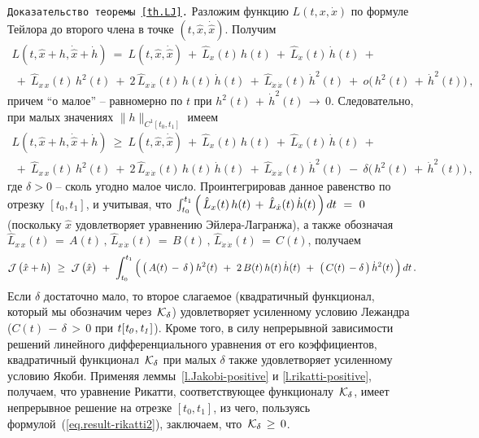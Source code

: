 \documentclass[12pt,a4paper]{article}
\newcommand{\cJ}{{\cal{J}}}
\newcommand{\cK}{{\cal{K}}}
\begin{document}
{\tt Доказательство теоремы~\ref{th.LJ}.} Разложим функцию $L(t,
x, \dot x)$ по формуле Тейлора до второго члена в точке $(t, \hat
x, \dot {\hat x})$. Получим
$$
\begin{array}{l}
L(t, \hat x + h, \dot {\hat x} + \dot h)\ =  \ L(t, \hat x, \dot
{\hat x} )\ + \
\hat L_{x}(t)\, h(t) \ + \ \hat L_{\dot x}(t)\, \dot h (t)\ +\  \\
\ +\ \hat L_{x\, x}(t)\, h^2(t) \ + \ 2\, \hat L_{x\, \dot x}(t)\,
h (t)\, \dot h (t)\ + \ \hat L_{\dot x \, \dot x}(t)\, {\dot h}^2
(t)\ + \ o\bigl(\, h^2(t)\, + \, {\dot h}^2(t)\bigr)\, ,
\end{array}
$$
причем ``о малое'' -- равномерно по $t$ при $h^2(t)\, + \, {\dot
h}^2(t) \, \to \, 0$. Следовательно, при малых значениях
$\|h\|_{C^1[t_0, t_1]}$ имеем
$$
\begin{array}{l}
L(t, \hat x + h, \dot {\hat x} + \dot h)\ \ge  \ L(t, \hat x, \dot
{\hat x} )\ + \
\hat L_{x}(t)\, h(t) \ + \ \hat L_{\dot x}(t)\, \dot h (t)\ +\  \\
\ +\ \hat L_{x\, x}(t)\, h^2(t) \ + \ 2\, \hat L_{x\, \dot x}(t)\,
h (t)\, \dot h (t)\ + \ \hat L_{\dot x \, \dot x}(t)\, {\dot h}^2
(t)\ - \ \delta \bigl(\, h^2(t)\, + \, {\dot h}^2(t)\bigr)\, ,
\end{array}
$$
где $\delta >0$ -- сколь угодно малое число. Проинтегрировав
данное равенство по отрезку $[t_0, t_1]$,  и учитывая, что
$\int_{t_0}^{t_1}\, \Bigl( \, \hat L_{x}(t)\, h(t) \, + \, \hat
L_{\dot x}(t)\, \dot h (t)\, \Bigr)\, d  t \ = \ 0$ (поскольку
$\hat x$ удовлетворяет уравнению Эйлера-Лагранжа), а также
обозначая $\hat L_{x\, x}(t)\, = \, A(t)\, , \, \hat L_{x\, \dot
x}(t)\, = \, B(t)\, , \, \hat L_{\dot x \, \dot x}(t)\, = \,
C(t)$, получаем
$$
\cJ\, \bigl( \hat x + h\bigr)\ \ge  \ \cJ\, \bigl( \hat x \bigr)\
+ \ \int_{t_0}^{t_1}\, \Bigl(\, \bigl( \, A(t)\, - \, \delta \,
\bigr) \, h^2(t) \ + \ 2\, B(t)\, h (t)\, \dot h (t)\ + \ \bigl(
\, C(t)\, - \delta \, \bigr)\, {\dot h}^2 (t)\, \Bigr)\, d t\, .
$$
Если $\delta$ достаточно мало, то второе слагаемое (квадратичный
функционал, который мы обозначим через~$\cK_{\delta}$)
удовлетворяет усиленному условию Лежандра ($C(t)\, - \, \delta \,
> \, 0$ при $t \it [t_0, t_1]$). Кроме того, в силу непрерывной
зависимости решений линейного дифференциального уравнения от его
коэффициентов, квадратичный функционал~$\cK_{\delta}$ при малых
$\delta$ также удовлетворяет усиленному условию Якоби. Применяя
леммы~\ref{l.Jakobi-positive} и \ref{l.rikatti-positive},
получаем, что уравнение Рикатти, соответствующее
функционалу~$\cK_{\delta}$,  имеет непрерывное решение на отрезке
$[t_0, t_1]$, из чего, пользуясь
формулой~(\ref{eq.result-rikatti2}), заключаем, что $\,
\cK_{\delta}\, \ge \, 0$.
\end{document}
